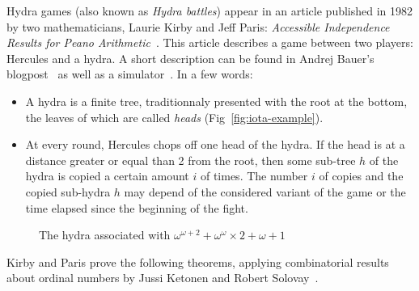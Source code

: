 \documentclass{easychair}
\begin{document}
Hydra games (also known as \emph{Hydra battles}) appear in an article published in 1982 by two mathematicians, 
Laurie Kirby and Jeff Paris: \emph{Accessible Independence Results for Peano Arithmetic}~\cite{KP82}.
This article describes a game between two players: Hercules and a hydra.
A short description  can be found in Andrej Bauer's blogpost~\cite{bauer2008} as well as a simulator~\cite{BauerHydra}.
In a few words:
\begin{itemize}
\item A hydra is a finite tree, traditionnaly presented with the root at the bottom, the leaves of which are called \emph{heads}
  (Fig~\vref{fig:iota-example}).
\item At every round, Hercules chops off one head of the hydra. If the head is at a distance greater or equal than 2 from the root,
  then some sub-tree $h$ of the hydra is copied a certain amount $i$ of times. The number $i$ of copies and the copied sub-hydra $h$ may depend of the considered variant of the game
  or the time elapsed since the beginning of the fight.
\end{itemize}
   \begin{figure}[htb]
\centering
{}
\caption{The hydra associated with $\omega^{\omega+2}+\omega^\omega \times 2 + \omega + 1$ \label{fig:iota-example}}

\end{figure}

Kirby and Paris prove the following theorems, applying
combinatorial results about ordinal numbers by Jussi Ketonen and Robert Solovay~\cite{KS81}.
\end{document}
